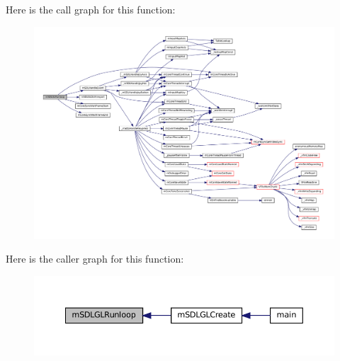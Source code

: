 Here is the call graph for this function\+:
\nopagebreak
\begin{figure}[H]
\begin{center}
\leavevmode
\includegraphics[width=350pt]{gl-sdl_8c_afe005d63d3605a9049c0aa730ad071b4_cgraph}
\end{center}
\end{figure}
Here is the caller graph for this function\+:
\nopagebreak
\begin{figure}[H]
\begin{center}
\leavevmode
\includegraphics[width=350pt]{gl-sdl_8c_afe005d63d3605a9049c0aa730ad071b4_icgraph}
\end{center}
\end{figure}
